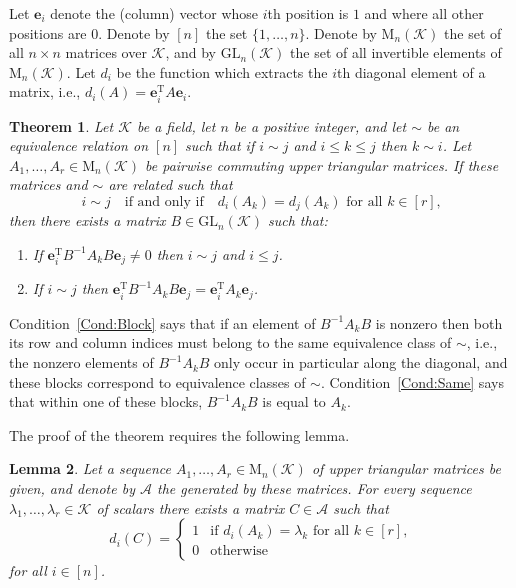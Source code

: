 \documentclass[12pt]{article}
\newtheorem{theorem}{Theorem}
\newtheorem{lemma}[theorem]{Lemma}
\newcommand{\mc}{\mathcal}
\newcommand{\vek}{\mathbf}
\newcommand{\Mat}{\mathrm{M}}
\newcommand{\GL}{\mathrm{GL}}
\newcommand{\Trans}[1]{#1^{\mathrm{T}}\!}
\begin{document}

Let $\vek{e}_i$ denote the (column) vector whose $i$th position is $1$ 
and where all other positions are $0$. Denote by $[n]$ the set 
$\{1,\dotsc,n\}$. Denote by $\Mat_n(\mc{K})$ the set of all $n \times 
n$ matrices over $\mc{K}$, and by $\GL_n(\mc{K})$ the set of all 
invertible elements of $\Mat_n(\mc{K})$. Let $d_i$ be the function 
which extracts the $i$th diagonal element of a matrix, i.e., \(d_i(A) 
= \Trans{\vek{e}_i} A \vek{e}_i\).

\begin{theorem}
  Let $\mc{K}$ be a field, let $n$ be a positive integer, and let $\sim$ 
  be an equivalence relation on $[n]$ such that if \(i \sim j\) and 
  \(i \leqslant k \leqslant j\) then \(k \sim i\). Let \(A_1,\dotsc,A_r 
  \in \Mat_n(\mc{K})\) be pairwise commuting upper triangular matrices. 
  If these matrices and $\sim$ are related such that
  \begin{equation*}
    i \sim j
    \quad\text{if and only if}\quad
    d_i(A_k) = d_j(A_k)
    \text{ for all }k \in [r]\text{,}
  \end{equation*}
  then there exists a matrix \(B \in \GL_n(\mc{K})\) such that:
  \begin{enumerate}
    \item \label{Cond:Block}
      If \(\Trans{\vek{e}_i} B^{-1} A_k B \vek{e}_j \neq 0\) then 
      \(i \sim j\) and \(i \leqslant j\).
    \item \label{Cond:Same}
      If \(i \sim j\) then \(\Trans{\vek{e}_i} B^{-1} A_k B 
      \vek{e}_j = \vek{e}_i^{\mathrm{T}} A_k \vek{e}_j\).
  \end{enumerate}
\end{theorem}

Condition~\ref{Cond:Block} says that if an element of $B^{-1}A_kB$ 
is nonzero then both its row and column indices must belong to the 
same equivalence class of $\sim$, i.e., the nonzero elements of 
$B^{-1}A_kB$ only occur in particular 
 
along the diagonal, and these blocks 
correspond to equivalence classes of $\sim$. 
Condition~\ref{Cond:Same} says that within one of these blocks, 
$B^{-1}A_kB$ is equal to $A_k$.

The proof of the theorem requires the following lemma.

\begin{lemma} \label{L:Kar.Matris}
  Let a sequence \(A_1,\dotsc,A_r \in \Mat_n(\mc{K})\) of upper 
  triangular matrices be given, and denote by $\mc{A}$ the 
    
  generated by these matrices. For every sequence 
  \(\lambda_1,\dotsc,\lambda_r \in \mc{K}\) of scalars there exists a 
  matrix \(C \in \mc{A}\) such that
  $$
    d_i(C) = \begin{cases}
      1& \text{if \(d_i(A_k)=\lambda_k\) for all \(k \in [r]\),}\\
      0& \text{otherwise}
    \end{cases}
  $$
  for all \(i \in [n]\).
\end{lemma}
\end{document}
